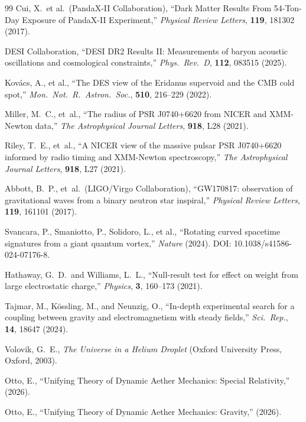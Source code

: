 \documentclass[12pt,letterpaper]{article}
\begin{document}
\begin{thebibliography}{99}
Cui, X.\ et al.\ (PandaX-II Collaboration),
``Dark Matter Results From 54-Ton-Day Exposure of PandaX-II Experiment,''
\textit{Physical Review Letters}, \textbf{119}, 181302 (2017).

DESI Collaboration,
``DESI DR2 Results II: Measurements of baryon acoustic oscillations and cosmological constraints,''
\textit{Phys.\ Rev.\ D}, \textbf{112}, 083515 (2025).

Kov\'acs, A., et al.,
``The DES view of the Eridanus supervoid and the CMB cold spot,''
\textit{Mon.\ Not.\ R.\ Astron.\ Soc.}, \textbf{510}, 216--229 (2022).

Miller, M.~C., et~al.,
``The radius of PSR J0740+6620 from NICER and XMM-Newton data,''
\textit{The Astrophysical Journal Letters}, \textbf{918}, L28 (2021).

Riley, T.~E., et~al.,
``A NICER view of the massive pulsar PSR J0740+6620
informed by radio timing and XMM-Newton spectroscopy,''
\textit{The Astrophysical Journal Letters}, \textbf{918}, L27 (2021).

Abbott, B.~P., et~al.\ (LIGO/Virgo Collaboration),
``GW170817: observation of gravitational waves from a
binary neutron star inspiral,''
\textit{Physical Review Letters}, \textbf{119}, 161101 (2017).

Svancara, P., Smaniotto, P., Solidoro, L., et al.,
``Rotating curved spacetime signatures from a giant quantum vortex,''
\textit{Nature} (2024). DOI: 10.1038/s41586-024-07176-8.

Hathaway, G.~D.\ and Williams, L.~L.,
``Null-result test for effect on weight from large electrostatic charge,''
\textit{Physics}, \textbf{3}, 160--173 (2021).

Tajmar, M., K\"ossling, M., and Neunzig, O.,
``In-depth experimental search for a coupling between gravity and electromagnetism with steady fields,''
\textit{Sci.\ Rep.}, \textbf{14}, 18647 (2024).

Volovik, G.~E.,
\textit{The Universe in a Helium Droplet}
(Oxford University Press, Oxford, 2003).

Otto, E.,
``Unifying Theory of Dynamic Aether Mechanics: Special Relativity,''
(2026).

Otto, E.,
``Unifying Theory of Dynamic Aether Mechanics: Gravity,''
(2026).


\end{thebibliography}
\end{document}
